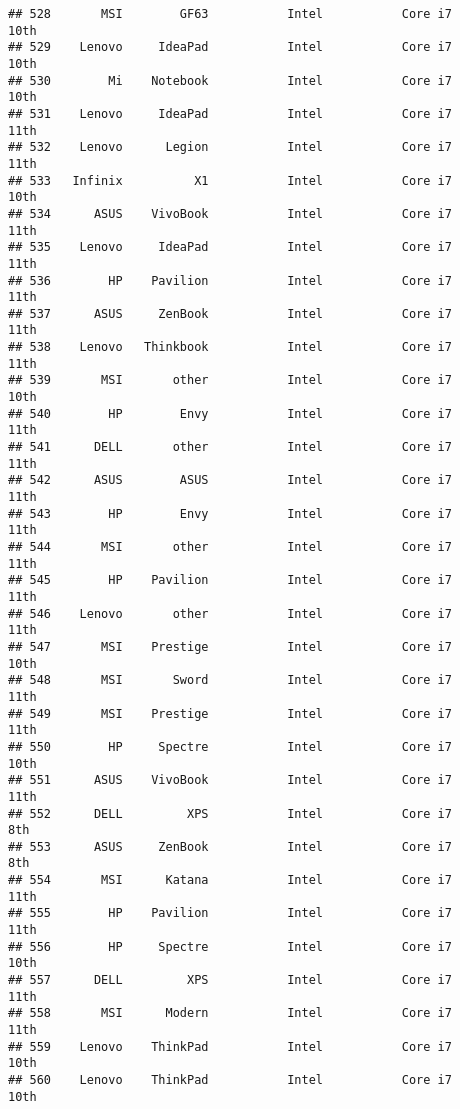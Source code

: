 \documentclass[
]{article}
\begin{document}
\begin{verbatim}
## 528       MSI        GF63           Intel           Core i7            10th
## 529    Lenovo     IdeaPad           Intel           Core i7            10th
## 530        Mi    Notebook           Intel           Core i7            10th
## 531    Lenovo     IdeaPad           Intel           Core i7            11th
## 532    Lenovo      Legion           Intel           Core i7            11th
## 533   Infinix          X1           Intel           Core i7            10th
## 534      ASUS    VivoBook           Intel           Core i7            11th
## 535    Lenovo     IdeaPad           Intel           Core i7            11th
## 536        HP    Pavilion           Intel           Core i7            11th
## 537      ASUS     ZenBook           Intel           Core i7            11th
## 538    Lenovo   Thinkbook           Intel           Core i7            11th
## 539       MSI       other           Intel           Core i7            10th
## 540        HP        Envy           Intel           Core i7            11th
## 541      DELL       other           Intel           Core i7            11th
## 542      ASUS        ASUS           Intel           Core i7            11th
## 543        HP        Envy           Intel           Core i7            11th
## 544       MSI       other           Intel           Core i7            11th
## 545        HP    Pavilion           Intel           Core i7            11th
## 546    Lenovo       other           Intel           Core i7            11th
## 547       MSI    Prestige           Intel           Core i7            10th
## 548       MSI       Sword           Intel           Core i7            11th
## 549       MSI    Prestige           Intel           Core i7            11th
## 550        HP     Spectre           Intel           Core i7            10th
## 551      ASUS    VivoBook           Intel           Core i7            11th
## 552      DELL         XPS           Intel           Core i7             8th
## 553      ASUS     ZenBook           Intel           Core i7             8th
## 554       MSI      Katana           Intel           Core i7            11th
## 555        HP    Pavilion           Intel           Core i7            11th
## 556        HP     Spectre           Intel           Core i7            10th
## 557      DELL         XPS           Intel           Core i7            11th
## 558       MSI      Modern           Intel           Core i7            11th
## 559    Lenovo    ThinkPad           Intel           Core i7            10th
## 560    Lenovo    ThinkPad           Intel           Core i7            10th

\end{verbatim}
\end{document}
